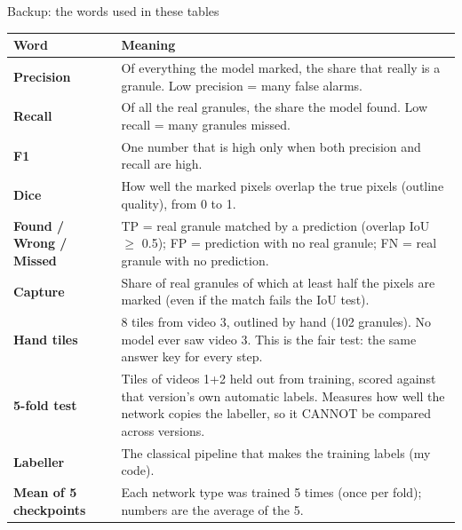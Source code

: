 \begin{frame}{Backup: the words used in these tables}
  \centering\scriptsize
  \renewcommand{\arraystretch}{1.05}\setlength{\tabcolsep}{3.5pt}
\begin{tabular}{@{}lp{11.8cm}@{}}
\toprule
\textbf{Word} & \textbf{Meaning} \\
\midrule
\textbf{Precision} & Of everything the model marked, the share that really is a granule. Low precision = many false alarms. \\
\textbf{Recall} & Of all the real granules, the share the model found. Low recall = many granules missed. \\
\textbf{F1} & One number that is high only when both precision and recall are high. \\
\textbf{Dice} & How well the marked pixels overlap the true pixels (outline quality), from 0 to 1. \\
\textbf{Found / Wrong / Missed} & TP = real granule matched by a prediction (overlap IoU $\geq$ 0.5); FP = prediction with no real granule; FN = real granule with no prediction. \\
\textbf{Capture} & Share of real granules of which at least half the pixels are marked (even if the match fails the IoU test). \\
\textbf{Hand tiles} & 8 tiles from video 3, outlined by hand (102 granules). No model ever saw video 3. This is the fair test: the same answer key for every step. \\
\textbf{5-fold test} & Tiles of videos 1+2 held out from training, scored against that version's own automatic labels. Measures how well the network copies the labeller, so it CANNOT be compared across versions. \\
\textbf{Labeller} & The classical pipeline that makes the training labels (my code). \\
\textbf{Mean of 5 checkpoints} & Each network type was trained 5 times (once per fold); numbers are the average of the 5. \\
\bottomrule
\end{tabular}
\end{frame}

